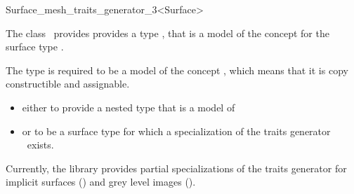 

\begin{ccRefClass}{Surface_mesh_traits_generator_3<Surface>}  %


\ccDefinition
  
The class \ccRefName\ provides 
provides a type  , that is 
a model of the concept 
for the surface type .

The type  is required to be a model of the concept
,
which means that it is copy constructible
and assignable.

\begin{itemize}
\item 
either to provide a nested type
that is a model of 
\item or to be a surface type for which a specialization
of the traits generator \ccRefName\ exists.
\end{itemize}
 

Currently, the library provides partial specializations
of  the   traits generator 
for implicit surfaces () and 
grey level images ().
 






\ccSeeAlso

  





\end{ccRefClass}


